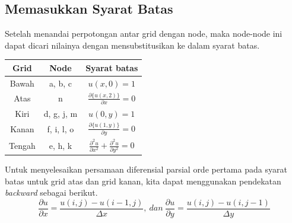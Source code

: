 \documentclass{article}
\begin{document}
\subsection{Memasukkan Syarat Batas}
Setelah menandai perpotongan antar grid dengan node, maka node-node ini dapat dicari nilainya dengan mensubstitusikan ke dalam syarat batas.

\begin{center}
\begin{tabular}{c c|c} 
Grid & Node & Syarat batas \\ [0.5ex]
\hline  
 Bawah & a, b, c & \({u(x,0)=1}\) \\ [0.5ex]
 Atas & n & \(\frac{\partial \{u(x,2)\}}{\partial x}=0\) \\  [0.5ex]
 Kiri & d, g, j, m & \({u(0,y)=1}\) \\ [0.5ex]
 Kanan & f, i, l, o & \(\frac{\partial \{u(1,y)\}}{\partial y}=0\)\\ [0.5ex]
 Tengah & e, h, k & \( \frac{\partial^2 u}{\partial x^2}+{\frac{\partial^2 u}{\partial y^2}}=0\) \\

\end{tabular}
\end{center}
\bigskip

Untuk menyelesaikan persamaan diferensial parsial orde pertama pada syarat batas untuk grid atas dan grid kanan, kita dapat menggunakan pendekatan \textit{backward} sebagai berikut.
\[\frac{\partial u}{\partial x}= \frac {u(i,j)-u(i-1,j)}{\Delta x},\ dan\ \frac{\partial u}{\partial y}= \frac {u(i,j)-u(i,j-1)}{\Delta y}\]
\end{document}
